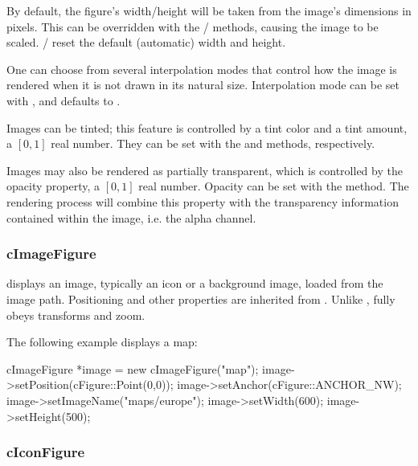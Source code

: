 By default, the figure's width/height will be taken from the image's
dimensions in pixels. This can be overridden with the /
 methods, causing the image to be scaled.
 /  reset the default (automatic) width
and height.

One can choose from several interpolation modes that control how the image
is rendered when it is not drawn in its natural size. Interpolation mode
can be set with , and defaults to
.

Images can be tinted; this feature is controlled by a tint color and a tint
amount, a $[0,1]$ real number. They can be set with the
 and  methods, respectively.

Images may also be rendered as partially transparent, which is controlled by
the opacity property, a $[0,1]$ real number. Opacity can be set with the
 method. The rendering process will combine this
property with the transparency information contained within the image, i.e.
the alpha channel.


\subsubsection{cImageFigure}
\label{sec:graphics:imagefigure}

 displays an image, typically an icon or a background
image, loaded from the {\opp} image path. Positioning and other properties
are inherited from . Unlike ,
 fully obeys transforms and zoom.

The following example displays a map:

\begin{cpp}
cImageFigure *image = new cImageFigure("map");
image->setPosition(cFigure::Point(0,0));
image->setAnchor(cFigure::ANCHOR_NW);
image->setImageName("maps/europe");
image->setWidth(600);
image->setHeight(500);
\end{cpp}



\subsubsection{cIconFigure}
\label{sec:graphics:iconfigure}

